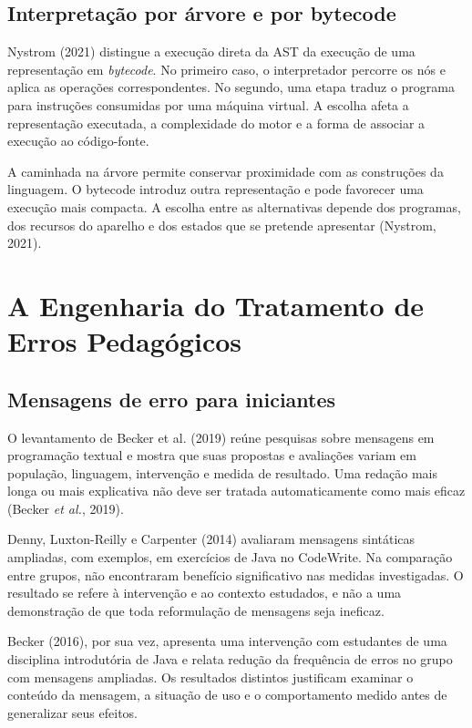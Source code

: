\documentclass[
    12pt
    ,oneside
    ,a4paper
    ,chapter=TITLE
    ,section=TITLE
    ,sumario=abnt-6027-2012]{abntex2}
\newcommand{\citeNystrom}{(Nystrom, 2021)}
\newcommand{\citeBecker}{(Becker \textit{et al.}, 2019)}
\begin{document}
\subsection{Interpretação por árvore e por bytecode}
Nystrom (2021) distingue a execução direta da AST da execução de uma representação
em \textit{bytecode}. No primeiro caso, o interpretador percorre os nós e aplica
as operações correspondentes. No segundo, uma etapa traduz o programa para
instruções consumidas por uma máquina virtual. A escolha afeta a representação
executada, a complexidade do motor e a forma de associar a execução ao código-fonte.

A caminhada na árvore permite conservar proximidade com as construções da
linguagem. O bytecode introduz outra representação e pode favorecer uma execução
mais compacta. A escolha entre as alternativas depende dos programas, dos recursos do aparelho e dos estados que se pretende apresentar \citeNystrom.

\section{A Engenharia do Tratamento de Erros Pedagógicos}

\subsection{Mensagens de erro para iniciantes}
O levantamento de Becker et al. (2019) reúne pesquisas sobre mensagens em
programação textual e mostra que suas propostas e avaliações variam em população,
linguagem, intervenção e medida de resultado. Uma redação mais longa ou mais
explicativa não deve ser tratada automaticamente como mais eficaz \citeBecker.

Denny, Luxton-Reilly e Carpenter (2014) avaliaram mensagens sintáticas ampliadas,
com exemplos, em exercícios de Java no CodeWrite. Na comparação entre grupos,
não encontraram benefício significativo nas medidas investigadas. O resultado
se refere à intervenção e ao contexto estudados, e não a uma demonstração de que
toda reformulação de mensagens seja ineficaz.

Becker (2016), por sua vez, apresenta uma intervenção com estudantes de uma
disciplina introdutória de Java e relata redução da frequência de erros no grupo
com mensagens ampliadas. Os resultados distintos justificam examinar o conteúdo
da mensagem, a situação de uso e o comportamento medido antes de generalizar
seus efeitos.
\end{document}

